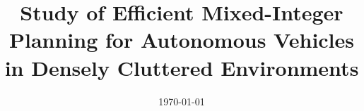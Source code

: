 \documentclass[a4paper, 11pt, oneside]{Thesis}  %
\begin{document}
	\frontmatter      %
	
	\title  {Study of Efficient Mixed-Integer Planning for Autonomous Vehicles in Densely Cluttered Environments}
	\addresses  {\groupname\\\deptname\\\univname}  %
	\date       {\today}
	\subject    {}
	\keywords   {}
	
	\maketitle
	
	
	\fancyhead{}  %
	\rhead{\thepage}  %
	\lhead{}  %
	
	\pagestyle{fancy}  %
	
\end{document}
